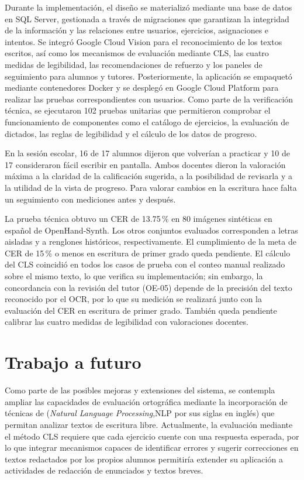 Durante la implementación, el diseño se materializó mediante una base de datos en SQL Server, gestionada a través de migraciones que garantizan la integridad de la información y las relaciones entre usuarios, ejercicios, asignaciones e intentos. Se integró Google Cloud Vision para el reconocimiento de los textos escritos, así como los mecanismos de evaluación mediante CLS, las cuatro medidas de legibilidad, las recomendaciones de refuerzo y los paneles de seguimiento para alumnos y tutores. Posteriormente, la aplicación se empaquetó mediante contenedores Docker y se desplegó en Google Cloud Platform para realizar las pruebas correspondientes con usuarios. Como parte de la verificación técnica, se ejecutaron 102 pruebas unitarias que permitieron comprobar el funcionamiento de componentes como el catálogo de ejercicios, la evaluación de dictados, las reglas de legibilidad y el cálculo de los datos de progreso.

En la sesión escolar, 16 de 17 alumnos dijeron que volverían a practicar y 10 de 17 consideraron fácil escribir en pantalla. Ambos docentes dieron la valoración máxima a la claridad de la calificación sugerida, a la posibilidad de revisarla y a la utilidad de la vista de progreso. Para valorar cambios en la escritura hace falta un seguimiento con mediciones antes y después.

La prueba técnica obtuvo un CER de 13.75\,\% en 80 imágenes sintéticas en español de OpenHand-Synth. Los otros conjuntos evaluados corresponden a letras aisladas y a renglones históricos, respectivamente. El cumplimiento de la meta de CER de 15\,\% o menos en escritura de primer grado queda pendiente. El cálculo del CLS coincidió en todos los casos de prueba con el conteo
manual realizado sobre el mismo texto, lo que verifica su implementación; sin embargo,
la concordancia con la revisión del tutor (OE-05) depende de la precisión del texto
reconocido por el OCR, por lo que su medición se realizará junto con la evaluación del
CER en escritura de primer grado. También queda pendiente calibrar las cuatro medidas de
legibilidad con valoraciones docentes.

{}
\section*{Trabajo a futuro}

Como parte de las posibles mejoras y extensiones del sistema, se contempla ampliar las capacidades de evaluación ortográfica mediante la incorporación de técnicas de (\textit{Natural Language Processing},NLP por sus siglas en inglés) que permitan analizar textos de escritura libre. Actualmente, la evaluación mediante el método CLS requiere que cada ejercicio cuente con una respuesta esperada, por lo que integrar mecanismos capaces de identificar errores y sugerir correcciones en textos redactados por los propios alumnos permitiría extender su aplicación a actividades de redacción de enunciados y textos breves.

